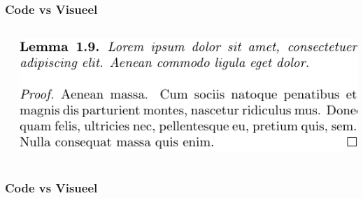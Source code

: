\documentclass[presentatie.tex]{subfiles}
\def\named#1{}
\begin{document}
    \begin{frame}
        \frametitle{Code vs Visueel}
        \begin{columns}
            \begin{column}{0.5\textwidth}
            \end{column}
            \begin{column}{0.5\textwidth}
                \includegraphics[width=\linewidth,height=0.8\textheight,keepaspectratio]{assets/latexRepeatEl.pdf}
            \end{column}
        \end{columns}
    \end{frame}

    \let\frameselection\somethingundefined
    
    \named{intro-visueelcomp-wordugly}
    
    \ifx\frameselection\somethingundefined
        \def\frameselection{1-}
    \fi
    
    \def\pasteframeselection#1{\begin{frame}<#1>}%
    \expandafter\pasteframeselection\expandafter{\frameselection}%
        \frametitle{Code vs Visueel}
    
\end{document}

